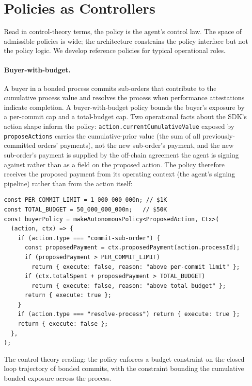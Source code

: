\documentclass[11pt,a4paper]{article}
\theoremstyle{definition}
\theoremstyle{remark}
\begin{document}
\section{Policies as Controllers}
\label{sec:policies}

Read in control-theory terms, the policy is the agent's control
law. The space of admissible policies is wide; the architecture
constrains the policy interface but not the policy logic. We
develop reference policies for typical operational roles.

\paragraph{Buyer-with-budget.}
A buyer in a bonded process commits sub-orders that contribute to
the cumulative process value and resolves the process when
performance attestations indicate completion. A buyer-with-budget
policy bounds the buyer's exposure by a per-commit cap and a
total-budget cap. Two operational facts about the SDK's action
shape inform the policy: \texttt{action.currentCumulativeValue}
exposed by \texttt{proposeActions} carries the cumulative-prior
value (the sum of all previously-committed orders' payments),
not the new sub-order's payment, and the new sub-order's payment
is supplied by the off-chain agreement the agent is signing
against rather than as a field on the proposed action. The
policy therefore receives the proposed payment from its
operating context (the agent's signing pipeline) rather than from
the action itself:

\begin{lstlisting}
const PER_COMMIT_LIMIT = 1_000_000_000n; // $1K
const TOTAL_BUDGET = 50_000_000_000n;   // $50K
const buyerPolicy = makeAutonomousPolicy<ProposedAction, Ctx>(
  (action, ctx) => {
    if (action.type === "commit-sub-order") {
      const proposedPayment = ctx.proposedPayment(action.processId);
      if (proposedPayment > PER_COMMIT_LIMIT)
        return { execute: false, reason: "above per-commit limit" };
      if (ctx.totalSpent + proposedPayment > TOTAL_BUDGET)
        return { execute: false, reason: "above total budget" };
      return { execute: true };
    }
    if (action.type === "resolve-process") return { execute: true };
    return { execute: false };
  },
);
\end{lstlisting}

The control-theory reading: the policy enforces a budget
constraint on the closed-loop trajectory of bonded commits, with
the constraint bounding the cumulative bonded exposure across the
process.
\end{document}
